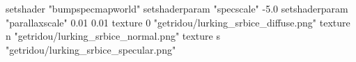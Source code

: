 setshader "bumpspecmapworld"
setshaderparam "specscale" -5.0
setshaderparam "parallaxscale" 0.01 0.01
texture 0 "getridou/lurking_srbice_diffuse.png"
texture n "getridou/lurking_srbice_normal.png"
texture s "getridou/lurking_srbice_specular.png"